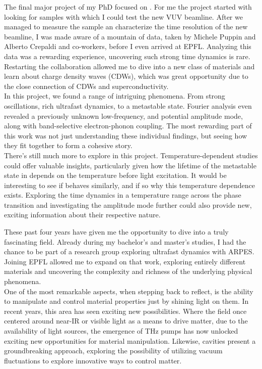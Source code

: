 The final major project of my PhD focused on .
For me the project started with looking for samples with which I could test the new VUV beamline.
After we managed to measure the sample an characterize the time resolution of the new beamline, I was made aware of a mountain of data, taken by Michele Puppin and Alberto Crepaldi and co-workers, before I even arrived at EPFL.
Analyzing this data was a rewarding experience, uncovering such strong time dynamics is rare.
Restarting the collaboration allowed me to dive into a new class of materials and learn about charge density waves (CDWs), which was great opportunity due to the close connection of CDWs and superconductivity.\\
In this project, we found a range of intriguing phenomena.
From strong oscillations, rich ultrafast dynamics, to a metastable state.
Fourier analysis even revealed a previously unknown low-frequency, and potential amplitude mode, along with band-selective electron-phonon coupling.
The most rewarding part of this work was not just understanding these individual findings, but seeing how they fit together to form a cohesive story.\\
There’s still much more to explore in this project.
Temperature-dependent studies could offer valuable insights, particularly given how the lifetime of the metastable state in  depends on the temperature before light excitation.
It would be interesting to see if  behaves similarly, and if so why this temperature dependence exists.
Exploring the time dynamics in a temperature range across the phase transition and investigating the amplitude mode further could also provide new, exciting information about their respective nature.\hfill\break

These past four years have given me the opportunity to dive into a truly fascinating field.
Already during my bachelor’s and master’s studies, I had the chance to be part of a research group exploring ultrafast dynamics with ARPES.
Joining EPFL allowed me to expand on that work, exploring entirely different materials and uncovering the complexity and richness of the underlying physical phenomena.\\
One of the most remarkable aspects, when stepping back to reflect, is the ability to manipulate and control material properties just by shining light on them.
In recent years, this area has seen exciting new possibilities.
Where the field once centered around near-IR or visible light as a means to drive matter, due to the availability of light sources, the emergence of \unit{THz} pumps has now unlocked exciting new opportunities for material manipulation.
Likewise, cavities present a groundbreaking approach, exploring the possibility of utilizing vacuum fluctuations to explore innovative ways to control matter.\hfill\break

